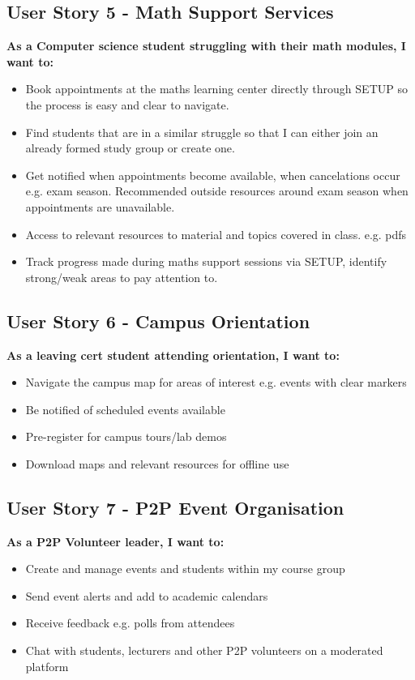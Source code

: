 \subsection*{User Story 5 - Math Support Services}
\textbf{As a Computer science student struggling with their math modules, I want to:} 
\begin{itemize}
\item Book appointments at the maths learning center directly through SETUP so the process is easy and clear to navigate.
\item Find students that are in a similar struggle so that I can either join an already formed study group or create one.
\item Get notified when appointments become available, when cancelations occur e.g. exam season. Recommended outside resources around exam season when appointments are unavailable.
\item Access to relevant resources to material and topics covered in class. e.g. pdfs
\item Track progress made during maths support sessions via SETUP, identify strong/weak areas to pay attention to.
\end{itemize}

\subsection*{User Story 6 - Campus Orientation}
\textbf{As a leaving cert student attending orientation, I want to:} 
\begin{itemize}
\item Navigate the campus map for areas of interest e.g. events with clear markers
\item Be notified of scheduled events available
\item Pre-register for campus tours/lab demos
\item Download maps and relevant resources for offline use
\end{itemize}

\subsection*{User Story 7 - P2P Event Organisation}
\textbf{As a P2P Volunteer leader, I want to:} 
\begin{itemize}
\item Create and manage events and students within my course group
\item Send event alerts and add to academic calendars
\item Receive feedback e.g. polls from attendees
\item Chat with students, lecturers and other P2P volunteers on a moderated platform
\end{itemize}

